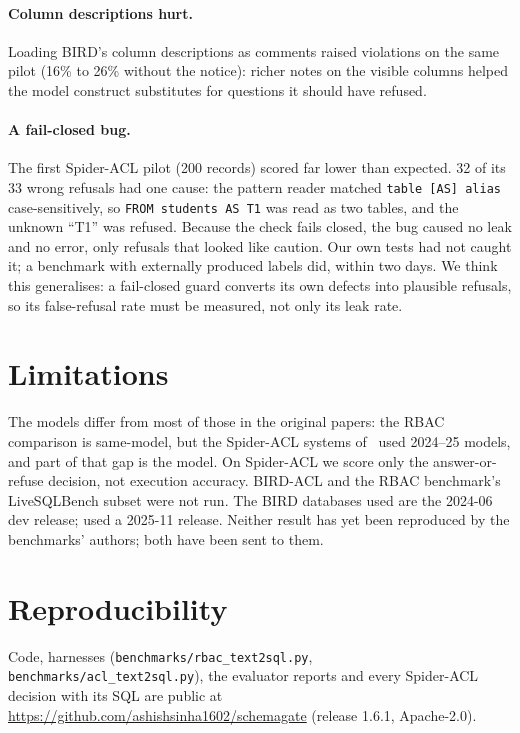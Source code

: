 \documentclass[11pt]{article}
\begin{document}
\paragraph{Column descriptions hurt.} Loading BIRD's column descriptions as comments raised violations
on the same pilot (16\% to 26\% without the notice): richer notes on the visible columns helped the
model construct substitutes for questions it should have refused.

\paragraph{A fail-closed bug.} The first Spider-ACL pilot (200 records) scored far lower than expected.
32 of its 33 wrong refusals had one cause: the pattern reader matched \texttt{table [AS] alias}
case-sensitively, so \texttt{FROM students AS T1} was read as two tables, and the unknown ``T1'' was
refused. Because the check fails closed, the bug caused no leak and no error, only refusals that looked
like caution. Our own tests had not caught it; a benchmark with externally produced labels did, within
two days. We think this generalises: a fail-closed guard converts its own defects into plausible
refusals, so its false-refusal rate must be measured, not only its leak rate.

\section{Limitations}
The models differ from most of those in the original papers: the RBAC comparison is same-model, but the
Spider-ACL systems of~\cite{klisura2026acl} used 2024--25 models, and part of that gap is the model.
On Spider-ACL we score only the answer-or-refuse decision, not execution accuracy. BIRD-ACL and the
RBAC benchmark's LiveSQLBench subset were not run. The BIRD databases used are the 2024-06 dev release;
\cite{fei2027rbac} used a 2025-11 release. Neither result has yet been reproduced by the benchmarks'
authors; both have been sent to them.

\section{Reproducibility}
Code, harnesses (\texttt{benchmarks/rbac\_text2sql.py}, \texttt{benchmarks/acl\_text2sql.py}), the
evaluator reports and every Spider-ACL decision with its SQL are public at
\url{https://github.com/ashishsinha1602/schemagate} (release 1.6.1, Apache-2.0).
\end{document}

